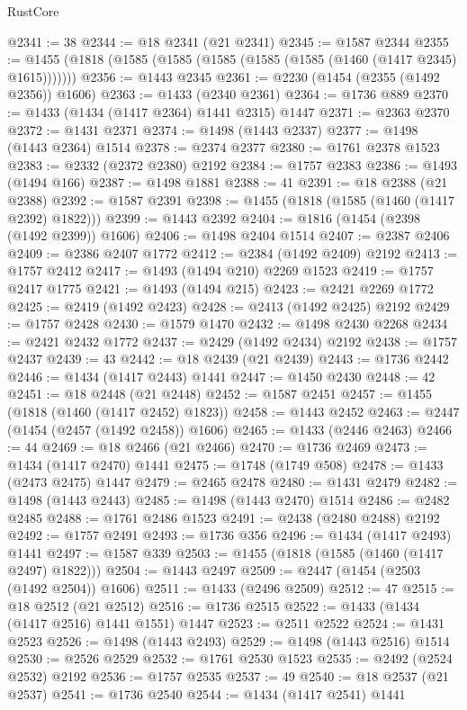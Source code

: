 \begin{lexlean}{RustCore}
\begin{coremodule}
@2341 := 38
@2344 := @18 @2341 (@21 @2341)
@2345 := @1587 @2344
@2355 := @1455 (@1818 (@1585 (@1585 (@1585 (@1585 (@1585 (@1460 (@1417 @2345) @1615)))))))
@2356 := @1443 @2345
@2361 := @2230 (@1454 (@2355 (@1492 @2356)) @1606)
@2363 := @1433 (@2340 @2361)
@2364 := @1736 @889
@2370 := @1433 (@1434 (@1417 @2364) @1441 @2315) @1447
@2371 := @2363 @2370
@2372 := @1431 @2371
@2374 := @1498 (@1443 @2337)
@2377 := @1498 (@1443 @2364) @1514
@2378 := @2374 @2377
@2380 := @1761 @2378 @1523
@2383 := @2332 (@2372 @2380) @2192
@2384 := @1757 @2383
@2386 := @1493 (@1494 @166)
@2387 := @1498 @1881
@2388 := 41
@2391 := @18 @2388 (@21 @2388)
@2392 := @1587 @2391
@2398 := @1455 (@1818 (@1585 (@1460 (@1417 @2392) @1822)))
@2399 := @1443 @2392
@2404 := @1816 (@1454 (@2398 (@1492 @2399)) @1606)
@2406 := @1498 @2404 @1514
@2407 := @2387 @2406
@2409 := @2386 @2407 @1772
@2412 := @2384 (@1492 @2409) @2192
@2413 := @1757 @2412
@2417 := @1493 (@1494 @210) @2269 @1523
@2419 := @1757 @2417 @1775
@2421 := @1493 (@1494 @215)
@2423 := @2421 @2269 @1772
@2425 := @2419 (@1492 @2423)
@2428 := @2413 (@1492 @2425) @2192
@2429 := @1757 @2428
@2430 := @1579 @1470
@2432 := @1498 @2430 @2268
@2434 := @2421 @2432 @1772
@2437 := @2429 (@1492 @2434) @2192
@2438 := @1757 @2437
@2439 := 43
@2442 := @18 @2439 (@21 @2439)
@2443 := @1736 @2442
@2446 := @1434 (@1417 @2443) @1441
@2447 := @1450 @2430
@2448 := 42
@2451 := @18 @2448 (@21 @2448)
@2452 := @1587 @2451
@2457 := @1455 (@1818 (@1460 (@1417 @2452) @1823))
@2458 := @1443 @2452
@2463 := @2447 (@1454 (@2457 (@1492 @2458)) @1606)
@2465 := @1433 (@2446 @2463)
@2466 := 44
@2469 := @18 @2466 (@21 @2466)
@2470 := @1736 @2469
@2473 := @1434 (@1417 @2470) @1441
@2475 := @1748 (@1749 @508)
@2478 := @1433 (@2473 @2475) @1447
@2479 := @2465 @2478
@2480 := @1431 @2479
@2482 := @1498 (@1443 @2443)
@2485 := @1498 (@1443 @2470) @1514
@2486 := @2482 @2485
@2488 := @1761 @2486 @1523
@2491 := @2438 (@2480 @2488) @2192
@2492 := @1757 @2491
@2493 := @1736 @356
@2496 := @1434 (@1417 @2493) @1441
@2497 := @1587 @339
@2503 := @1455 (@1818 (@1585 (@1460 (@1417 @2497) @1822)))
@2504 := @1443 @2497
@2509 := @2447 (@1454 (@2503 (@1492 @2504)) @1606)
@2511 := @1433 (@2496 @2509)
@2512 := 47
@2515 := @18 @2512 (@21 @2512)
@2516 := @1736 @2515
@2522 := @1433 (@1434 (@1417 @2516) @1441 @1551) @1447
@2523 := @2511 @2522
@2524 := @1431 @2523
@2526 := @1498 (@1443 @2493)
@2529 := @1498 (@1443 @2516) @1514
@2530 := @2526 @2529
@2532 := @1761 @2530 @1523
@2535 := @2492 (@2524 @2532) @2192
@2536 := @1757 @2535
@2537 := 49
@2540 := @18 @2537 (@21 @2537)
@2541 := @1736 @2540
@2544 := @1434 (@1417 @2541) @1441

\end{coremodule}
\end{lexlean}
